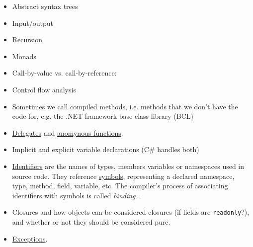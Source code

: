 \documentclass[a4paper,12pt]{article}
\begin{document}
\begin{itemize}
  \item Abstract syntax trees
  \item Input/output
  \item Recursion
  \item Monads
  \item Call-by-value vs. call-by-reference: %
  \item Control flow analysis
  \item Sometimes we call compiled methods, i.e. methods that we don’t have the code for, e.g. the .NET framework base class library (BCL)
  \item \href{https://docs.microsoft.com/en-us/dotnet/csharp/programming-guide/delegates/}{Delegates} and \href{https://docs.microsoft.com/en-us/dotnet/csharp/programming-guide/statements-expressions-operators/anonymous-functions}{anomynous functions}.
  \item Implicit and explicit variable declarations (C\# handles both)
  \item \href{https://docs.microsoft.com/en-us/dotnet/csharp/programming-guide/inside-a-program/identifier-names}{Identifiers} are the names of types, members variables or namespaces used in source code. They reference \href{https://docs.microsoft.com/en-us/dotnet/csharp/roslyn-sdk/work-with-semantics#symbols}{symbols}, representing a declared namespace, type, method, field, variable, etc. The compiler's process of associating identifiers with symbols is called \textit{binding}~\cite{microsoft-semantic-analysis}. %
  \item Closures and how objects can be considered closures (if fields are \texttt{readonly}?), and whether or not they should be considered pure.
  \item \href{https://docs.microsoft.com/en-us/dotnet/csharp/programming-guide/exceptions/}{Exceptions}.
\end{itemize}
\end{document}
